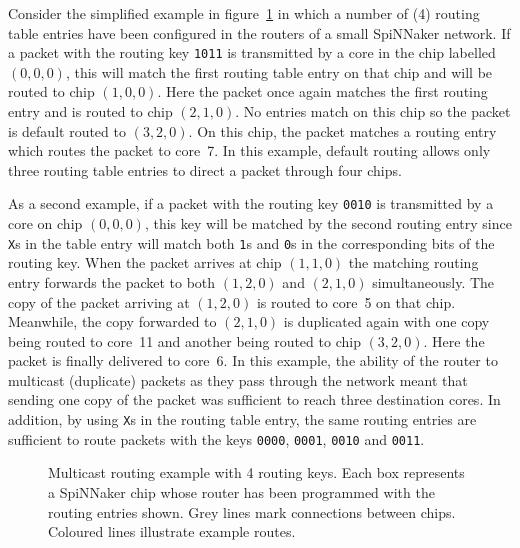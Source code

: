 			Consider the simplified example in figure~\ref{fig:routing-example} in
			which a number of (\SI{4}{\bit}) routing table entries have been
			configured in the routers of a small SpiNNaker network. If a packet with
			the routing key \texttt{1011} is transmitted by a core in the chip
			labelled $(0, 0, 0)$, this will match the first routing table entry on
			that chip and will be routed to chip $(1, 0, 0)$. Here
			the packet once again matches the first routing entry and is routed to
			chip $(2, 1, 0)$. No entries match on this chip so the packet is
			default routed to $(3, 2, 0)$. On this chip, the packet matches a
			routing entry which routes the packet to core~7. In this example, default
			routing allows only three routing table entries to direct a packet
			through four chips.
			
			As a second example, if a packet with the routing key \texttt{0010} is
			transmitted by a core on chip $(0, 0, 0)$, this key will be matched by
			the second routing entry since \texttt{X}s in the table entry will match
			both \texttt{1}s and \texttt{0}s in the corresponding bits of the routing
			key. When the packet arrives at chip $(1, 1, 0)$ the matching routing
			entry forwards the packet to both $(1, 2, 0)$ and $(2, 1, 0)$
			simultaneously. The copy of the packet arriving at $(1, 2, 0)$ is routed
			to core~5 on that chip.  Meanwhile, the copy forwarded to $(2, 1, 0)$ is
			duplicated again with one copy being routed to core~11 and another being
			routed to chip $(3, 2, 0)$. Here the packet is finally delivered to
			core~6. In this example, the ability of the router to multicast
			(duplicate) packets as they pass through the network meant that sending
			one copy of the packet was sufficient to reach three destination cores.
			In addition, by using \texttt{X}s in the routing table entry, the same
			routing entries are sufficient to route packets with the keys
			\texttt{0000}, \texttt{0001}, \texttt{0010} and \texttt{0011}.
			
			\begin{figure}
				\center
				
				\caption[Multicast routing example.]%
				{Multicast routing example with \SI{4}{\bit} routing keys. Each
				box represents a SpiNNaker chip whose router has been programmed with
				the routing entries shown. Grey lines mark connections between chips.
				Coloured lines illustrate example routes.}
				\label{fig:routing-example}
			\end{figure}
			
